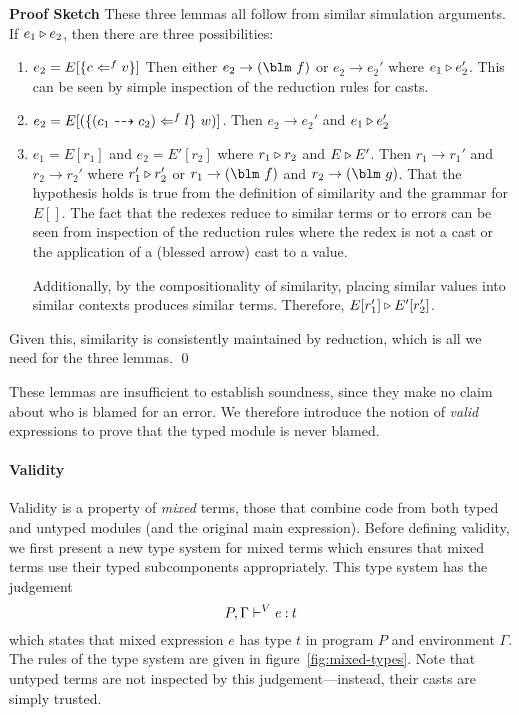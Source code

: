 {\noindent\textbf{Proof Sketch}
These three lemmas all follow from similar simulation arguments.  If
$e_1 \triangleright e_2$, then there are three possibilities:
\begin{enumerate}
\item $e_2 = E[\{c \Leftarrow^{f} v\}]$  Then either $e_2 \rightarrow
  \blame{f}$ or $e_2 \rightarrow e_2'$ where $e_1 \triangleright e_2'$.
  This can be seen by simple inspection of the reduction rules for
  casts.
\item $e_2 = E[(\{(c_1 \dashrightarrow c_2) \Leftarrow^{f} l\}\ w)]$.  Then $e_2
  \rightarrow e_2'$ and $e_1 \triangleright e_2'$
\item $e_1 = E[r_1]$ and $e_2 = E'[r_2]$ where $r_1 \triangleright r_2$
  and $E \triangleright E'$.  Then $r_1
  \rightarrow r_1'$ and $r_2 \rightarrow r_2'$ where
  $r_1' \triangleright r_2'$ or $r_1 \rightarrow \blame{f}$ and $r_2
  \rightarrow \blame{g}$.  That the hypothesis holds is true from the
  definition of similarity and the grammar for $E[]$.  The fact that
  the redexes reduce to similar terms or to errors can be seen from inspection of
  the reduction rules where the redex is not a cast or the application
  of a (blessed arrow) cast to a value.

  Additionally, by the compositionality of similarity, placing
  similar values into similar contexts produces similar terms.
  Therefore, $E[r'_1] \triangleright E'[r'_2]$.
\end{enumerate}
Given this, similarity is consistently maintained by reduction, which
is all we need for the three lemmas. \qed

These lemmas are insufficient to establish soundness, since
they make no claim about who is blamed for an error.  We therefore
introduce the notion of \emph{valid} expressions to prove that the
typed module is never blamed.

\paragraph{Validity}
Validity is a property of \emph{mixed} terms, those that combine code
from both typed and untyped modules (and the original main
expression).  Before defining validity, we first present a new type
system for mixed terms which ensures that  mixed terms use their typed subcomponents
appropriately. This type system has the judgement
$$
P, \Gamma \vdash^V_{} e \mathbin{:} t
$$
which states that mixed expression $e$ has type $t$ in program $P$
and environment
$\Gamma$.  
The rules of the type system are given in figure~\ref{fig:mixed-types}.
Note that untyped terms are not inspected by this judgement---instead,
their casts are simply trusted.  


}
